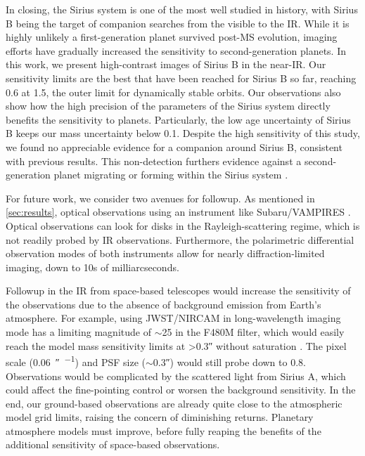 \documentclass[twocolumn,linenumbers]{aastex631}
\begin{document}
In closing, the Sirius system is one of the most well studied in history, with Sirius B being the target of companion searches from the visible to the IR. While it is highly unlikely a first-generation planet survived post-MS evolution, imaging efforts have gradually increased the sensitivity to second-generation planets. In this work, we present high-contrast images of Sirius B in the near-IR. Our sensitivity limits are the best that have been reached for Sirius B so far, reaching \qty{0.6}{\jupitermass} at \qty{1.5}{\au}, the outer limit for dynamically stable orbits. Our observations also show how the high precision of the parameters of the Sirius system directly benefits the sensitivity to planets. Particularly, the low age uncertainty of Sirius B keeps our mass uncertainty below \qty{0.1}{\jupitermass}. Despite the high sensitivity of this study, we found no appreciable evidence for a companion around Sirius B, consistent with previous results. This non-detection furthers evidence against a second-generation planet migrating or forming within the Sirius system \citep{viganHighcontrastImagingSirius2015}.

For future work, we consider two avenues for followup. As mentioned in \cref{sec:results}, optical observations using an instrument like Subaru/VAMPIRES . Optical observations can look for disks in the Rayleigh-scattering regime, which is not readily probed by IR observations. Furthermore, the polarimetric differential observation modes of both instruments allow for nearly diffraction-limited imaging, down to 10s of milliarcseconds.

Followup in the IR from space-based telescopes would increase the sensitivity of the observations due to the absence of background emission from Earth's atmosphere. For example, using JWST/NIRCAM in long-wavelength imaging mode has a limiting magnitude of $\sim$25 in the F480M filter, which would easily reach the model mass sensitivity limits at \textgreater\ang{;;0.3} without saturation . The pixel scale (\qty{0.06}{\arcsecond\per\pixel}) and PSF size ($\sim$\ang{;;0.3}) would still probe down to \qty{0.8}{\au}. Observations would be complicated by the scattered light from Sirius A, which could affect the fine-pointing control or worsen the background sensitivity. In the end, our ground-based observations are already quite close to the atmospheric model grid limits, raising the concern of diminishing returns. Planetary atmosphere models must improve, before fully reaping the benefits of the additional sensitivity of space-based observations.
\end{document}
